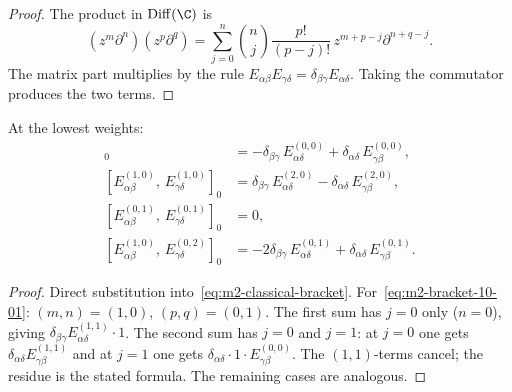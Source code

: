 \begin{proof}
The product in $\Diff(\C)$ is
\[
(z^m\partial^n)(z^p\partial^q)
= \sum_{j=0}^{n}\binom{n}{j}
\frac{p!}{(p-j)!}\,z^{m+p-j}\partial^{n+q-j}.
\]
The matrix part multiplies by the rule
$E_{\alpha\beta}E_{\gamma\delta}
= \delta_{\beta\gamma}E_{\alpha\delta}$.
Taking the commutator produces the two terms.
\end{proof}

\begin{corollary}
At the lowest weights:
\begin{align}
[E^{(1,0)}_{\alpha\beta},\,E^{(0,1)}_{\gamma\delta}]_0
&= -\delta_{\beta\gamma}\,E^{(0,0)}_{\alpha\delta}
+ \delta_{\alpha\delta}\,E^{(0,0)}_{\gamma\beta},
\\[4pt]
[E^{(1,0)}_{\alpha\beta},\,E^{(1,0)}_{\gamma\delta}]_0
&= \delta_{\beta\gamma}\,E^{(2,0)}_{\alpha\delta}
- \delta_{\alpha\delta}\,E^{(2,0)}_{\gamma\beta},
\\[4pt]
[E^{(0,1)}_{\alpha\beta},\,E^{(0,1)}_{\gamma\delta}]_0
&= 0,
\\[4pt]
[E^{(1,0)}_{\alpha\beta},\,E^{(0,2)}_{\gamma\delta}]_0
&= -2\delta_{\beta\gamma}\,E^{(0,1)}_{\alpha\delta}
+ \delta_{\alpha\delta}\,E^{(0,1)}_{\gamma\beta}.
\end{align}
\end{corollary}

\begin{proof}
Direct substitution into~\eqref{eq:m2-classical-bracket}.
For~\eqref{eq:m2-bracket-10-01}: $(m,n)=(1,0)$, $(p,q)=(0,1)$.
The first sum has $j=0$ only ($n=0$), giving
$\delta_{\beta\gamma}E^{(1,1)}_{\alpha\delta}\cdot 1$.
The second sum has $j=0$ and $j=1$: at $j=0$ one gets
$\delta_{\alpha\delta}E^{(1,1)}_{\gamma\beta}$ and at $j=1$
one gets $\delta_{\alpha\delta}\cdot 1\cdot E^{(0,0)}_{\gamma\beta}$.
The $(1,1)$-terms cancel; the residue is the stated formula.
The remaining cases are analogous.
\end{proof}

